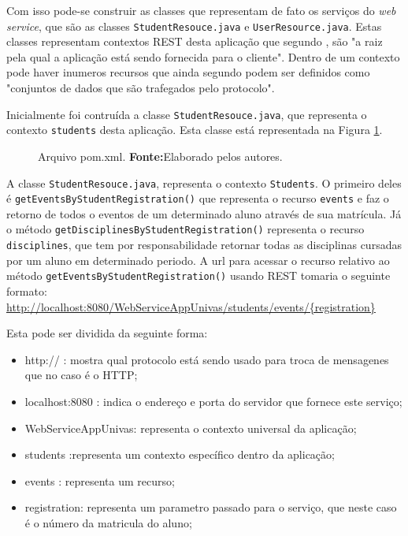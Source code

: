 	\par Com isso pode-se construir as classes que representam de fato os serviços
do \textit{web service}, que são as classes \texttt{StudentResouce.java} e
\texttt{UserResource.java}. Estas classes representam contextos REST desta
aplicação que segundo , são "a raiz pela qual a
aplicação está sendo fornecida para o cliente". Dentro de um contexto pode haver
inumeros recursos que ainda segundo  podem ser
definidos como "conjuntos de dados que são trafegados pelo protocolo".

	\par Inicialmente foi contruída a classe \texttt{StudentResouce.java}, que
representa o contexto \texttt{students} desta aplicação. Esta classe está
representada na Figura \ref{fig:desws24}.

	\begin{figure}[h!]
		
		\caption[Arquivo \texttt{pom.xml}]{Arquivo pom.xml.
		\textbf{Fonte:}Elaborado pelos autores.}
		\label{fig:desws24}
	\end{figure}
		
	\par A classe \texttt{StudentResouce.java}, representa o contexto
\texttt{Students}. O primeiro deles é \texttt{getEventsByStudentRegistration()}
que representa o recurso \texttt{events} e faz o retorno de todos o eventos de
um determinado aluno através de sua matrícula. Já o método
\texttt{getDisciplinesByStudentRegistration()} representa o recurso
\texttt{disciplines}, que tem por responsabilidade retornar todas as
disciplinas cursadas por um aluno em determinado periodo. A url para acessar o recurso
relativo ao método \texttt{getEventsByStudentRegistration()} usando REST
tomaria o seguinte formato:\\
\url{http://localhost:8080/WebServiceAppUnivas/students/events/{registration}}
	
	\par Esta pode ser dividida da seguinte forma:

	\begin{itemize}
	  \item http:// : mostra qual protocolo está sendo usado para troca de
	  mensagenes que no caso é o HTTP;
	  \item localhost:8080 : indica o endereço e porta do servidor que fornece este
	  serviço;
	  \item WebServiceAppUnivas: representa o contexto universal da aplicação; 
	  \item students :representa um contexto específico dentro da aplicação;
	  \item events : representa um recurso;
	  \item registration: representa um parametro passado para o serviço, que
	  neste caso é o número da matricula do aluno;
	\end{itemize}

